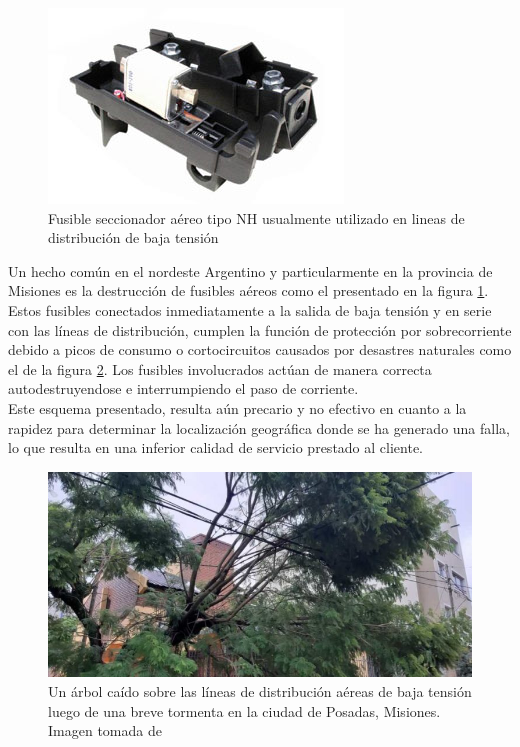 \begin{figure}[h!]
	\centering
	\includegraphics[width=0.7\linewidth]{Figures/NH_aereo_bt}
	\caption{Fusible seccionador aéreo tipo NH usualmente utilizado en lineas de distribución de baja tensión}
	\label{fig:nh_aereo_bt}
\end{figure}
Un hecho común en el nordeste Argentino y particularmente en la provincia de Misiones es la destrucción de fusibles aéreos como el presentado en la figura \ref{fig:nh_aereo_bt}. Estos fusibles conectados inmediatamente a la salida de baja tensión y en serie con las líneas de distribución, cumplen la función de protección por sobrecorriente debido a picos de consumo o cortocircuitos causados por desastres naturales como el de la figura \ref{fig:arbolcaidolineabt}. Los fusibles involucrados actúan de manera correcta autodestruyendose e interrumpiendo el paso de corriente.\\
Este esquema presentado, resulta aún precario y no efectivo en cuanto a la rapidez para determinar la localización geográfica donde se ha generado una falla, lo que resulta en una inferior calidad de servicio prestado al cliente.\\
\begin{figure}[h!]
	\centering
	\includegraphics[width=0.7\linewidth]{Figures/arbol_caido_linea_bt}
	\caption{Un árbol caído sobre las líneas de distribución aéreas de baja tensión luego de una breve tormenta en la ciudad de Posadas, Misiones. Imagen tomada de \citep{Noticia_MNES}}
	\label{fig:arbolcaidolineabt}
\end{figure}

